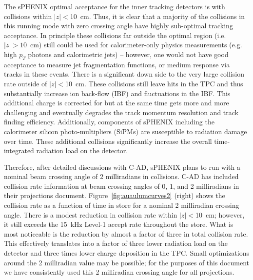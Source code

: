 The sPHENIX optimal acceptance for the inner tracking detectors is with collisions within $|z|<$10~cm.   Thus, it is clear that a majority of the collisions in this running mode with zero crossing angle have highly sub-optimal tracking acceptance.   In principle these collisions far outside the optimal region (i.e. $|z| > 10$~cm) still could be used for calorimeter-only physics measurements (e.g. high $p_{T}$ photons and calorimetric jets) -- however, one would not have good acceptance to measure jet fragmentation functions, or medium response via tracks in these events.    There is a significant down side to the very large collision rate outside of $|z|<$10~cm.   These collisions still leave hits in the TPC and thus substantially increase ion back-flow (IBF) and fluctuations in the IBF.   This additional charge is corrected for but at the same time gets more and more challenging and eventually degrades the track momentum resolution and track finding efficiency.    Additionally, components of sPHENIX including the calorimeter silicon photo-multipliers (SiPMs) are susceptible to radiation damage over time.   These additional collisions significantly increase the overall time-integrated radiation load on the detector.

Therefore, after detailed discussions with C-AD, sPHENIX plans to run with a nominal beam crossing angle of 2 milliradians in \auau collisions.    C-AD has included collision rate information at beam crossing angles of 0, 1, and 2 milliradians in their projections document.    Figure~\ref{fig:auaulumcurves2} (right) shows the collision rate as a function of time in store for a nominal 2 milliradian crossing angle.   There is a modest reduction in collision rate within $|z|<$10~cm; however, it still exceeds the 15~kHz Level-1 accept rate throughout the store.   What is most noticeable is the reduction by almost a factor of three in total collision rate.   This effectively translates into a factor of three lower radiation load on the detector and three times lower charge deposition in the TPC.   Small optimizations around the 2 milliradian value may be possible; for the purposes of this document we have consistently used this 2 milliradian crossing angle for all projections.


